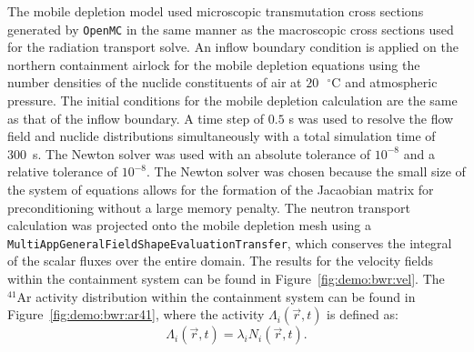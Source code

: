 The mobile depletion model used microscopic transmutation cross sections generated by \texttt{OpenMC} in the same manner as the macroscopic cross sections used for the radiation transport solve. An inflow boundary condition is applied on the northern containment airlock for the mobile depletion equations using the number densities of the nuclide constituents of air at $\mathrm{20\text{ }^{\circ}C}$ and atmospheric pressure. The initial conditions for the mobile depletion calculation are the same as that of the inflow boundary. A time step of $\mathrm{0.5}$ s was used to resolve the flow field and nuclide distributions simultaneously with a total simulation time of 300~s. The Newton solver was used with an absolute tolerance of $10^{-8}$ and a relative tolerance of $10^{-8}$. The Newton solver was chosen because the small size of the system of equations allows for the formation of the Jacaobian matrix for preconditioning without a large memory penalty. The neutron transport calculation was projected onto the mobile depletion mesh using a \texttt{MultiAppGeneralFieldShapeEvaluationTransfer}, which conserves the integral of the scalar fluxes over the entire domain. The results for the velocity fields within the containment system can be found in Figure~\ref{fig:demo:bwr:vel}. The $\mathrm{^{41}Ar}$ activity distribution within the containment system can be found in Figure~\ref{fig:demo:bwr:ar41}, where the activity $\Lambda_{i}(\vec{r}, t)$ is defined as:
\begin{equation}
    \Lambda_{i}(\vec{r}, t) = \lambda_{i}N_{i}(\vec{r}, t)\text{.}
\end{equation}

